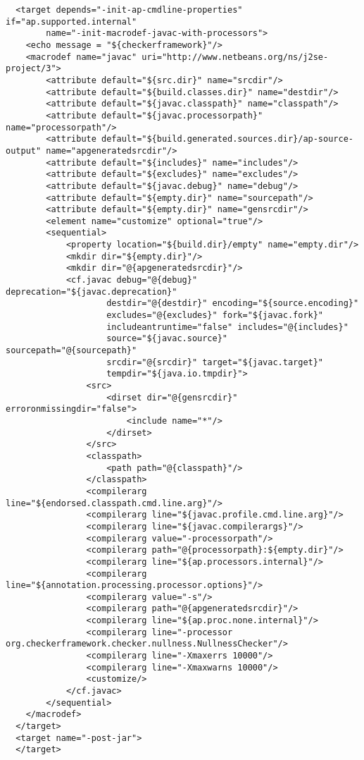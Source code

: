 \begin{enumerate}
\begin{smaller}
\begin{Verbatim}
  <target depends="-init-ap-cmdline-properties" if="ap.supported.internal"
        name="-init-macrodef-javac-with-processors">
    <echo message = "${checkerframework}"/>
    <macrodef name="javac" uri="http://www.netbeans.org/ns/j2se-project/3">
        <attribute default="${src.dir}" name="srcdir"/>
        <attribute default="${build.classes.dir}" name="destdir"/>
        <attribute default="${javac.classpath}" name="classpath"/>
        <attribute default="${javac.processorpath}" name="processorpath"/>
        <attribute default="${build.generated.sources.dir}/ap-source-output" name="apgeneratedsrcdir"/>
        <attribute default="${includes}" name="includes"/>
        <attribute default="${excludes}" name="excludes"/>
        <attribute default="${javac.debug}" name="debug"/>
        <attribute default="${empty.dir}" name="sourcepath"/>
        <attribute default="${empty.dir}" name="gensrcdir"/>
        <element name="customize" optional="true"/>
        <sequential>
            <property location="${build.dir}/empty" name="empty.dir"/>
            <mkdir dir="${empty.dir}"/>
            <mkdir dir="@{apgeneratedsrcdir}"/>
            <cf.javac debug="@{debug}" deprecation="${javac.deprecation}"
                    destdir="@{destdir}" encoding="${source.encoding}"
                    excludes="@{excludes}" fork="${javac.fork}"
                    includeantruntime="false" includes="@{includes}"
                    source="${javac.source}" sourcepath="@{sourcepath}"
                    srcdir="@{srcdir}" target="${javac.target}"
                    tempdir="${java.io.tmpdir}">
                <src>
                    <dirset dir="@{gensrcdir}" erroronmissingdir="false">
                        <include name="*"/>
                    </dirset>
                </src>
                <classpath>
                    <path path="@{classpath}"/>
                </classpath>
                <compilerarg line="${endorsed.classpath.cmd.line.arg}"/>
                <compilerarg line="${javac.profile.cmd.line.arg}"/>
                <compilerarg line="${javac.compilerargs}"/>
                <compilerarg value="-processorpath"/>
                <compilerarg path="@{processorpath}:${empty.dir}"/>
                <compilerarg line="${ap.processors.internal}"/>
                <compilerarg line="${annotation.processing.processor.options}"/>
                <compilerarg value="-s"/>
                <compilerarg path="@{apgeneratedsrcdir}"/>
                <compilerarg line="${ap.proc.none.internal}"/>
                <compilerarg line="-processor org.checkerframework.checker.nullness.NullnessChecker"/>
                <compilerarg line="-Xmaxerrs 10000"/>
                <compilerarg line="-Xmaxwarns 10000"/>
                <customize/>
            </cf.javac>
        </sequential>
    </macrodef>
  </target>
  <target name="-post-jar">
  </target>
\end{Verbatim}
\end{smaller}


\end{enumerate}
